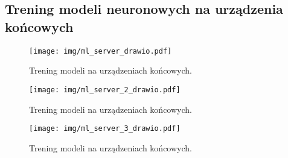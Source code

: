 \subsection{Trening modeli neuronowych na urządzenia końcowych}

\begin{figure}[h!]
    \centering
    \texttt{[image: img/ml\_server\_drawio.pdf]}
    \caption{Trening modeli na urządzeniach końcowych.}
    \vspace{-4mm}
\end{figure}

\begin{figure}[h!]
    \centering
    \texttt{[image: img/ml\_server\_2\_drawio.pdf]}
    \caption{Trening modeli na urządzeniach końcowych.}
    \vspace{-4mm}
\end{figure}


\begin{figure}[h!]
    \centering
    \texttt{[image: img/ml\_server\_3\_drawio.pdf]}
    \caption{Trening modeli na urządzeniach końcowych.}
    \vspace{-4mm}
\end{figure}
